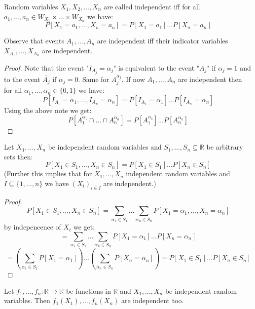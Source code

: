 \begin{definition}
    Random variables $X_1, X_2, \dots, X_n$ are called independent iff for all $a_1, \dots, a_n \in W_{X_1} \times \dots \times W_{X_n}$ we have:
    $$P[X_1=a_1, \dots, X_n=a_n] = P[X_1=a_1] \dots P[X_n=a_n]$$
\end{definition}

\begin{lemma}
    Observe that events $A_1, \dots, A_n$ are independent iff their indicator variables $X_{A_1}, \dots, X_{A_n}$ are independent.
\end{lemma}

\begin{proof}
    Note that the event "$I_{A_j} = \alpha_j$" is equivalent to the event "$A_j$" if $\alpha_j = 1$ and to the event $\bar{A_j}$ if $\alpha_j = 0$. Same for $A_j^{\alpha_j}$.
    If now $A_1, \dots, A_n$ are independent then for all $\alpha_1, \dots, \alpha_n \in \{0,1\}$ we have:
    $$P[I_{A_1} = \alpha_1, \dots, I_{A_n} = \alpha_n] = P[I_{A_1} = \alpha_1] \dots P[I_{A_n} = \alpha_n]$$
    Using the above note we get:
    $$P[A_1^{\alpha_1} \cap \dots \cap A_n^{\alpha_n}] = P[A_1^{\alpha_1}] \dots P[A_n^{\alpha_n}]$$
\end{proof}

\begin{lemma}
    Let $X_1, \dots, X_n$ be independent random variables and $S_1, \dots, S_n \subseteq \mathbb{R}$ be arbitrary sets then:
    $$P[X_1 \in S_1, \dots, X_n \in S_n] = P[X_1 \in S_1] \dots P[X_n \in S_n]$$
    (Further this implies that for $X_1, \dots, X_n$ independent random variables and $I \subseteq \{1, \dots, n\}$ we have $(X_i)_{i \in I}$ are independent.)
\end{lemma}

\begin{proof}
    $$P[X_1\in S_1, \dots , X_n\in S_n] = \sum_{\alpha_1 \in S_1} \dots \sum_{\alpha_n \in S_n} P[X_1=\alpha_1, \dots, X_n=\alpha_n]$$
    by indepencence of $X_i$ we get:
    $$= \sum_{\alpha_1 \in S_1} \dots \sum_{\alpha_n \in S_n} P[X_1=\alpha_1] \dots P[X_n=\alpha_n]$$
    $$= (\sum_{\alpha_1 \in S_1} P[X_1=\alpha_1]) \dots (\sum_{\alpha_n \in S_n} P[X_n=\alpha_n]) = P[X_1\in S_1] \dots P[X_n\in S_n]$$
\end{proof}

\begin{theorem}
    Let $f_1, \dots, f_n: \mathbb{R} \to \mathbb{R}$ be functions in $\mathbb{R}$ and $X_1, \dots, X_n$ be independent random variables. Then $f_1(X_1), \dots, f_n(X_n)$ are independent too.
\end{theorem}

